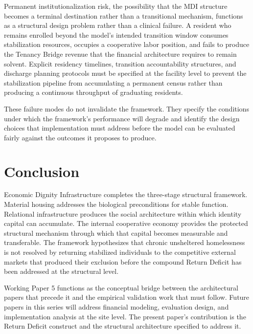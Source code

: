 \documentclass[12pt, letterpaper]{article}
\begin{document}
Permanent institutionalization risk, the possibility that the MDI structure becomes a terminal destination rather than a transitional mechanism, functions as a structural design problem rather than a clinical failure. A resident who remains enrolled beyond the model's intended transition window consumes stabilization resources, occupies a cooperative labor position, and fails to produce the Tenancy Bridge revenue that the financial architecture requires to remain solvent. Explicit residency timelines, transition accountability structures, and discharge planning protocols must be specified at the facility level to prevent the stabilization pipeline from accumulating a permanent census rather than producing a continuous throughput of graduating residents.

These failure modes do not invalidate the framework. They specify the conditions under which the framework's performance will degrade and identify the design choices that implementation must address before the model can be evaluated fairly against the outcomes it proposes to produce.

\section{Conclusion}

Economic Dignity Infrastructure completes the three-stage structural framework. Material housing addresses the biological preconditions for stable function. Relational infrastructure produces the social architecture within which identity capital can accumulate. The internal cooperative economy provides the protected structural mechanism through which that capital becomes measurable and transferable. The framework hypothesizes that chronic unsheltered homelessness is not resolved by returning stabilized individuals to the competitive external markets that produced their exclusion before the compound Return Deficit has been addressed at the structural level.

Working Paper 5 functions as the conceptual bridge between the architectural papers that precede it and the empirical validation work that must follow. Future papers in this series will address financial modeling, evaluation design, and implementation analysis at the site level. The present paper's contribution is the Return Deficit construct and the structural architecture specified to address it.

\newpage
{}


\end{document}
